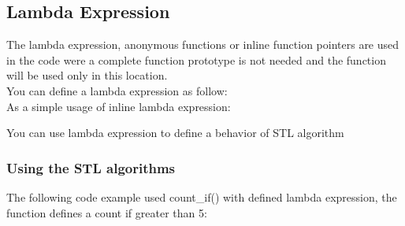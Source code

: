 \documentclass{article}
\begin{document}
\subsection{Lambda Expression}
The lambda expression, anonymous functions or inline function pointers are used in the code were a complete function prototype is not needed and the function will be used only in this location.\\
You can define a lambda expression as follow:\\


As a simple usage of inline lambda expression:


You can use lambda expression to define a behavior of STL algorithm 


\subsubsection{Using the STL algorithms}
The following code example used count\_if() with defined lambda expression, the function defines a count if greater than 5:

\end{document}
